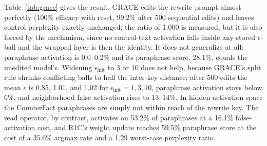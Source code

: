 \documentclass[preprint,12pt]{elsarticle}
\begin{document}
Table~\ref{tab:grace} gives the result. GRACE edits the rewrite prompt almost perfectly (100\% efficacy with reset, 99.2\% after 500 sequential edits) and leaves control perplexity exactly unchanged; the ratio of 1.000 is measured, but it is also forced by the mechanism, since no control-text activation falls inside any stored $\epsilon$-ball and the wrapped layer is then the identity. It does not generalize at all: paraphrase activation is 0.0--0.2\% and its paraphrase score, 28.1\%, equals the unedited model's. Widening $\epsilon_{\mathrm{init}}$ to 3 or 10 does not help, because GRACE's split rule shrinks conflicting balls to half the inter-key distance; after 500 edits the mean $\epsilon$ is 0.85, 1.01, and 1.02 for $\epsilon_{\mathrm{init}}=1,3,10$, paraphrase activation stays below 6\%, and neighborhood false activation rises to 13--14\%. In hidden-activation space the CounterFact paraphrases are simply not within reach of the rewrite key. The read operator, by contrast, activates on 53.2\% of paraphrases at a 16.1\% false-activation cost, and R1C's weight update reaches 59.5\% paraphrase score at the cost of a 35.6\% argmax rate and a 1.29 worst-case perplexity ratio.
\end{document}
